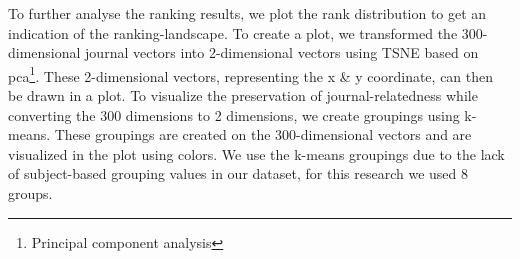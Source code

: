 \documentclass[../../Thesis.tex]{subfiles}
\begin{document}
\clearpage
{}
To further analyse the ranking results, we plot the rank distribution to get an indication of the ranking-landscape.
To create a plot, we transformed the 300-dimensional journal vectors into 2-dimensional vectors using TSNE based on pca\footnote{Principal component analysis}. These 2-dimensional vectors, representing the x \& y coordinate, can then be drawn in a plot. To visualize the preservation of journal-relatedness while converting the 300 dimensions to 2 dimensions, we create groupings using k-means. These groupings are created on the 300-dimensional vectors and are visualized in the plot using colors. We use the k-means groupings due to the lack of subject-based grouping values in our dataset, for this research we used 8 groups.
\end{document}
